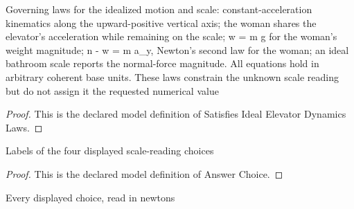 \begin{definition}
  \label{def:physics:phyx-mini-0803:phyxminiproblems-problemphyxmini0803-satisfiesidealelevatordynamicslaws}
  Governing laws for the idealized motion and scale: constant-acceleration kinematics along the upward-positive vertical axis; the woman shares the elevator's acceleration while remaining on the scale; w = m g for the woman's weight magnitude; n - w = m a\_y, Newton's second law for the woman; an ideal bathroom scale reports the normal-force magnitude. All equations hold in arbitrary coherent base units. These laws constrain the unknown scale reading but do not assign it the requested numerical value
\end{definition}
\begin{proof}
  This is the declared model definition of Satisfies Ideal Elevator Dynamics Laws.
\end{proof}
\begin{definition}
  \label{def:physics:phyx-mini-0803:phyxminiproblems-problemphyxmini0803-answerchoice}
  Labels of the four displayed scale-reading choices
\end{definition}
\begin{proof}
  This is the declared model definition of Answer Choice.
\end{proof}
\begin{definition}
  \label{def:physics:phyx-mini-0803:phyxminiproblems-problemphyxmini0803-displayedscalereadinginnewtons}
  Every displayed choice, read in newtons
\end{definition}
